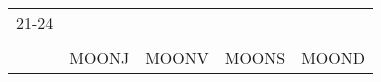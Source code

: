 \begin{tabularx}{\linewidth}{|c|X|X|p{2cm}|p{2cm}|}
          \hline 
          21-24&\phantom{Lorem ipsum dolor sit amet, consectetur}  &  \phantom{Lorem ipsum dolor sit amet, consectetur}           & \phantom{Lorem ipsum} & \phantom{Lorem ipsum }\\
          \phantom{aa}&\phantom{Lorem ipsum dolor sit amet, consectetur}  &  \phantom{Lorem ipsum dolor sit amet, consectetur}    & \phantom{Lorem ipsum} & \phantom{Lorem ipsum }\\
          \hline
                      & MOONJ & MOONV & MOONS & MOOND\\
          \hline    
        \end{tabularx}
